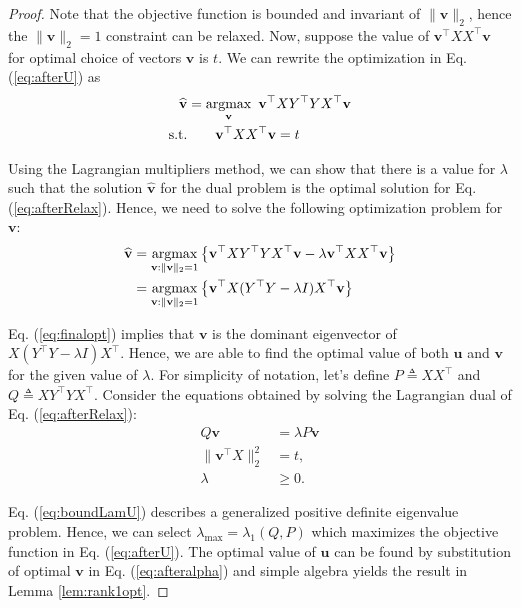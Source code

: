 \begin{proof}
Note that the objective function is bounded and invariant of $\|\mathbf{v}\|_2$, hence the $\|\mathbf{v}\|_2 = 1$ constraint can be relaxed. Now, suppose the value of $\mathbf{v}^{\top}XX^{\top}\mathbf{v}$ for optimal choice of vectors $\mathbf{v}$ is $t$.  We can rewrite the optimization in Eq. (\ref{eq:afterU}) as
\begin{align}
\widehat{\mathbf{v}} &= \operatorname*{argmax}_{\mathbf{v}} ~\mathbf{v}^{\top}XY^{\top}YX^{\top}\mathbf{v} \nonumber\\
\mathrm{s.t.} &\qquad \mathbf{v}^{\top}XX^{\top}\mathbf{v} = t
\label{eq:afterRelax}
\end{align}

Using the Lagrangian multipliers method, we can show that there is a value for $\lambda$ such that the solution $\widehat{\mathbf{v}}$ for the dual problem is the optimal solution for Eq. (\ref{eq:afterRelax}). Hence, we need to solve the following optimization problem for $\mathbf{v}$:
\begin{align}
\widehat{\mathbf{v}} & = \operatorname*{argmax}_{\mathbf{v}: \|\mathbf{v}\|_2 =1} \left\{\mathbf{v}^{\top}XY^{\top}YX^{\top}\mathbf{v}  - \lambda \mathbf{v}^{\top}XX^{\top}\mathbf{v} \right\}\nonumber\\
 & = \operatorname*{argmax}_{\mathbf{v}: \|\mathbf{v}\|_2 =1} \left\{\mathbf{v}^{\top}X(Y^{\top}Y - \lambda I) X^{\top}\mathbf{v}  \right\} \label{eq:finalopt}
\end{align}

Eq. (\ref{eq:finalopt}) implies that $\mathbf{v}$ is the dominant eigenvector of $X(Y^{\top}Y - \lambda I) X^{\top}$. Hence, we are able to find the optimal value of both $\mathbf{u}$ and $\mathbf{v}$ for the given value of $\lambda$. For simplicity of notation, let's define $P \triangleq XX^{\top}$ and $Q \triangleq XY^{\top}YX^{\top}$.
Consider the equations obtained by solving the Lagrangian dual of Eq. (\ref{eq:afterRelax}):
\begin{align}
Q\mathbf{v} &= \lambda P\mathbf{v}\label{eq:boundLamU}\\
\|\mathbf{v}^{\top}X\|_2^2 &= t,\label{eq:boundScaling}\\
 \lambda &\geq 0\label{eq:boundLamL}.
\end{align}

Eq. (\ref{eq:boundLamU}) describes a generalized positive definite eigenvalue problem. Hence, we can select $\lambda_{\max} = \lambda_{1}(Q, P)$ which maximizes the objective function in Eq. (\ref{eq:afterU}). The optimal value of $\mathbf{u}$ can be found by substitution of optimal $\mathbf{v}$ in Eq. (\ref{eq:afteralpha}) and simple algebra yields the result in Lemma \ref{lem:rank1opt}.
\end{proof}